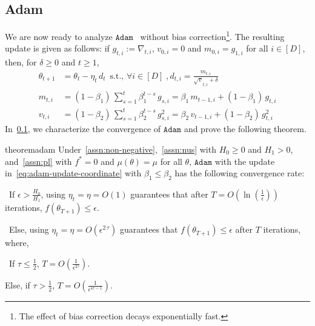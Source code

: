 \documentclass{article}
\newcommand{\ti}[1]{#1_{t,i}}
\newcommand{\tpi}[1]{#1_{t-1,i}}
\newcommand{\si}[1]{#1_{s,i}}
\newcommand{\tht}{\theta_t}
\newcommand{\thtt}{\theta_{t+1}}
\newcommand{\etat}{{\eta_t}}
\newcommand{\Adam}{\texttt{Adam}}
\begin{document}
\subsection{Adam}
\label{sec:adam}
We are now ready to analyze $\Adam$~\citep{kingma2014adam} without bias correction\footnote{The effect of bias correction decays exponentially fast.}. The resulting update is given as follows: if $\ti{g} := \nabla_{t,i}$, $v_{0,i} = 0$ and $m_{0,i} = g_{1,i}$ for all $i \in [D]$, then,  for $\delta \geq 0$ and $t \geq 1$,
\begin{align}
\thtt &= \tht - \etat \, d_t \, \text{ s.t., } \forall i \in [D] \;, d_{t,i} = \frac{\ti{m}}{\ti{\sqrt{v}} + \delta} \label{eq:adam-update-coordinate}  \\
\ti{m} & = (1-\beta_1) \, \sum_{s = 1}^t \beta_1^{t -s} \, \si{g}  = \beta_1 \, \tpi{m} + (1-\beta_1) \, \ti{g} \nonumber \\
\ti{v} & = (1-\beta_2) \, \sum_{s = 1}^t \beta_2^{t -s} \, \si{g^2}  = \beta_2 \, \tpi{v} + (1-\beta_2) \, \ti{g^2} \nonumber
\end{align}
In~\cref{sec:adam}, we characterize the convergence of $\Adam$ and prove the following theorem. 
\begin{restatable}{theorem}{adam}
Under~\cref{assn:non-negative},~\cref{assn:nus} with $H_0 \geq 0$ and $H_1 > 0$, and~\cref{assn:pl} with $f^* = 0$ and $\mu(\theta) = \mu$ for all $\theta$, $\Adam$ with the update in~\cref{eq:adam-update-coordinate} with $\beta_1 \leq \beta_2$ has the following convergence rate: 

\textbullet\ If $\epsilon > \frac{H_0}{H_1}$, using $\etat = \eta = O(1)$ guarantees that after $T = O\left( \ln\left(\frac{1}{\epsilon}\right)\right)$ iterations, $f(\theta_{T+1}) \leq \epsilon$. 

\textbullet\ Else, using $\etat = \eta = O(\epsilon^{2 \, \tau})$ guarantees that $f(\theta_{T+1}) \leq \epsilon$ after $T$ iterations, where,

\textbullet\ If $\tau \leq \frac{1}{2}$, $T = O \left( \frac{1}{\epsilon^{2 \tau}} \right)$. 

\textbullet Else, if $\tau > \frac{1}{2}$, $T = O \left( \frac{1}{\epsilon^{4 \tau - 1}}  \right)$. 

\label{thm:adam-pl}
\end{restatable}
\end{document}
